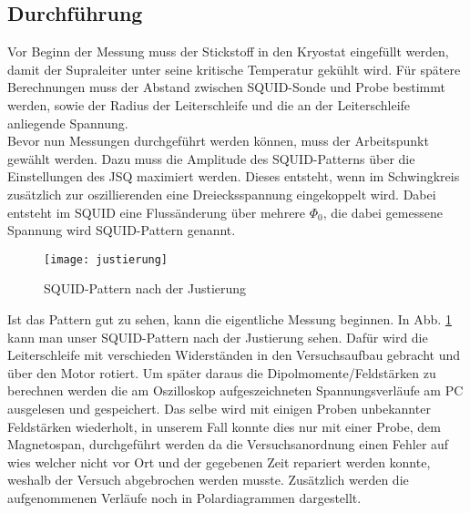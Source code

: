 \subsection{Durchführung}
Vor Beginn der Messung muss der Stickstoff in den Kryostat eingefüllt werden, damit der Supraleiter unter seine kritische Temperatur gekühlt wird. Für spätere Berechnungen muss der Abstand zwischen SQUID-Sonde und Probe bestimmt werden, sowie der Radius der Leiterschleife und die an der Leiterschleife anliegende Spannung.\\
Bevor nun Messungen durchgeführt werden können, muss der Arbeitspunkt gewählt werden. Dazu muss die Amplitude des SQUID-Patterns über die Einstellungen des JSQ maximiert werden. Dieses entsteht, wenn im Schwingkreis zusätzlich zur oszillierenden eine Dreiecksspannung eingekoppelt wird. Dabei entsteht im SQUID eine Flussänderung über mehrere $\Phi_0$, die dabei gemessene Spannung wird SQUID-Pattern genannt.\\
\begin{figure}[h]
\begin{center}
\texttt{[image: justierung]}
\caption{SQUID-Pattern nach der Justierung}
\label{fig:pattern}
\end{center}
\end{figure}
Ist das Pattern gut zu sehen, kann die eigentliche Messung beginnen. In Abb. \ref{fig:pattern} kann man unser SQUID-Pattern nach der Justierung sehen. Dafür wird die Leiterschleife mit verschieden Widerständen in den Versuchsaufbau gebracht und über den Motor rotiert. Um später daraus die Dipolmomente/Feldstärken zu berechnen werden die am Oszilloskop aufgeszeichneten Spannungsverläufe am PC ausgelesen und gespeichert. Das selbe wird mit einigen Proben unbekannter Feldstärken wiederholt, in unserem Fall konnte dies nur mit einer Probe, dem Magnetospan, durchgeführt werden da die Versuchsanordnung einen Fehler auf wies welcher nicht vor Ort und der gegebenen Zeit repariert werden konnte, weshalb der Versuch abgebrochen werden musste. Zusätzlich werden die aufgenommenen Verläufe noch in Polardiagrammen dargestellt.
